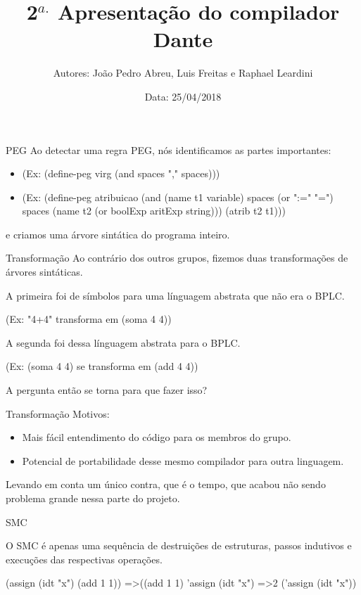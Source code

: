 \documentclass{beamer}
\title[Compiladores 2018.1]{2$^{a.}$ Apresentação do compilador Dante}
\author[Abrev.]{Autores: João Pedro Abreu, Luis Freitas e Raphael Leardini}
\institute[UFF]{Universidade Federal Fluminense}
\date{Data: 25/04/2018}
\begin{document}

\begin{frame}[plain]

\titlepage

\end{frame}


\begin{frame}{PEG}
Ao detectar uma regra PEG, nós identificamos as partes importantes:
\begin{itemize}
	\item (Ex: (define-peg virg (and spaces "," spaces)))
	\item (Ex: (define-peg atribuicao (and (name t1 variable) spaces (or ":=" "=") spaces (name t2 (or boolExp aritExp string))) (atrib t2 t1))) 
\end{itemize}
e criamos uma árvore sintática do programa inteiro.
\end{frame}


\begin{frame}{Transformação}
Ao contrário dos outros grupos, fizemos duas transformações de árvores sintáticas.

A primeira foi de símbolos para uma línguagem abstrata que não era o BPLC.

(Ex: "4+4" transforma em (soma 4 4))

A segunda foi dessa línguagem abstrata para o BPLC.

(Ex: (soma 4 4) se transforma em (add 4 4))

A pergunta então se torna para que fazer isso?

\end{frame}

\begin{frame}{Transformação}
Motivos:
\begin{itemize}

   \item Mais fácil entendimento do código para os membros do grupo.
   \item Potencial de portabilidade desse mesmo compilador para outra linguagem.
   
\end{itemize}
Levando em conta um único contra, que é o tempo, que acabou não sendo problema grande nessa parte do projeto.
\end{frame}

\begin{frame}{SMC}

O SMC é apenas uma sequência de destruições de estruturas, passos indutivos e
execuções das respectivas operações.

(assign (idt "x") (add 1 1)) =\textgreater ((add 1 1) 'assign (idt "x")
=\textgreater 2  ('assign (idt "x")) 


\end{frame}
\end{document}
